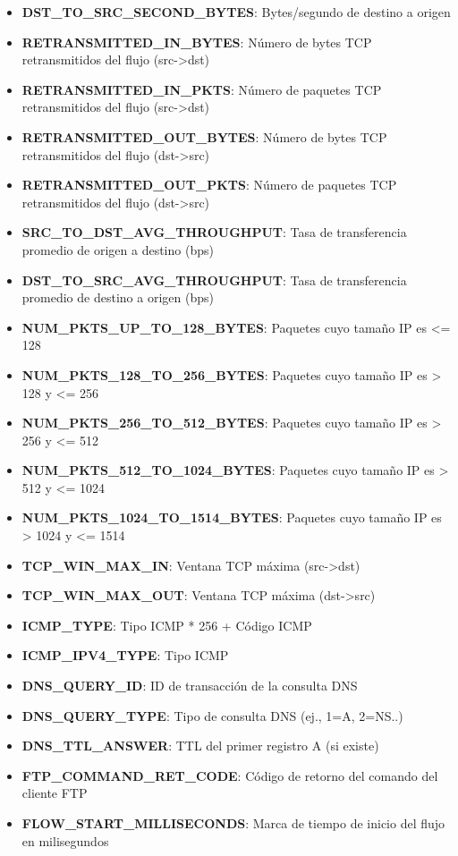 \begin{itemize}
    \item \textbf{DST\_TO\_SRC\_SECOND\_BYTES}: Bytes/segundo de destino a origen
    \item \textbf{RETRANSMITTED\_IN\_BYTES}: Número de bytes TCP retransmitidos del flujo (src->dst)
    \item \textbf{RETRANSMITTED\_IN\_PKTS}: Número de paquetes TCP retransmitidos del flujo (src->dst)
    \item \textbf{RETRANSMITTED\_OUT\_BYTES}: Número de bytes TCP retransmitidos del flujo (dst->src)
    \item \textbf{RETRANSMITTED\_OUT\_PKTS}: Número de paquetes TCP retransmitidos del flujo (dst->src)
    \item \textbf{SRC\_TO\_DST\_AVG\_THROUGHPUT}: Tasa de transferencia promedio de origen a destino (bps)
    \item \textbf{DST\_TO\_SRC\_AVG\_THROUGHPUT}: Tasa de transferencia promedio de destino a origen (bps)
    \item \textbf{NUM\_PKTS\_UP\_TO\_128\_BYTES}: Paquetes cuyo tamaño IP es <= 128
    \item \textbf{NUM\_PKTS\_128\_TO\_256\_BYTES}: Paquetes cuyo tamaño IP es > 128 y <= 256
    \item \textbf{NUM\_PKTS\_256\_TO\_512\_BYTES}: Paquetes cuyo tamaño IP es > 256 y <= 512
    \item \textbf{NUM\_PKTS\_512\_TO\_1024\_BYTES}: Paquetes cuyo tamaño IP es > 512 y <= 1024
    \item \textbf{NUM\_PKTS\_1024\_TO\_1514\_BYTES}: Paquetes cuyo tamaño IP es > 1024 y <= 1514
    \item \textbf{TCP\_WIN\_MAX\_IN}: Ventana TCP máxima (src->dst)
    \item \textbf{TCP\_WIN\_MAX\_OUT}: Ventana TCP máxima (dst->src)
    \item \textbf{ICMP\_TYPE}: Tipo ICMP * 256 + Código ICMP
    \item \textbf{ICMP\_IPV4\_TYPE}: Tipo ICMP
    \item \textbf{DNS\_QUERY\_ID}: ID de transacción de la consulta DNS
    \item \textbf{DNS\_QUERY\_TYPE}: Tipo de consulta DNS (ej., 1=A, 2=NS..)
    \item \textbf{DNS\_TTL\_ANSWER}: TTL del primer registro A (si existe)
    \item \textbf{FTP\_COMMAND\_RET\_CODE}: Código de retorno del comando del cliente FTP
    \item \textbf{FLOW\_START\_MILLISECONDS}: Marca de tiempo de inicio del flujo en milisegundos

\end{itemize}
